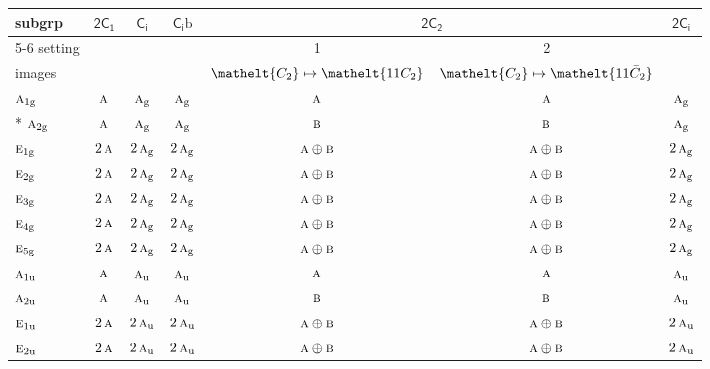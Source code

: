 \documentclass[10pt,a4paper]{article}
\numberwithin{equation}{section}
\newcommand{\eltfont}[1]{{\let\sigma\eltsigma\mathelt{#1}}}
\newcommand{\grp}[1]{\mathsf{#1}}
\newcommand{\irr}[1]{\text{\normalfont\scshape #1}}
\newcommand{\cls}[1]{\eltfont{#1}}
\newcommand{\ptag}[1]{\mathrm{#1}}
\newcommand{\barred}[1]{\bar{#1}}
\newcommand{\secondclass}{\mathrm{b}}
\begin{document}
{\small\begin{longtable}{@{}lcccccc@{}}\toprule
subgrp & \href{2C1.pdf}{$\grp{2C_{1}}$} & \href{S2.pdf}{$\grp{C_{i}}$} & \href{S2b.pdf}{$\grp{C_{i}}\secondclass$} & \multicolumn{2}{c}{\href{2C2.pdf}{$\grp{2C_{2}}$}} & \href{2S2.pdf}{$\grp{2C_{i}}$}\\\cmidrule(lr){5-6}
setting &  &  &  & 1 & 2 & \\
images &  &  &  & {\scriptsize $\cls{C_{2}} \mapsto \cls{11C_{2}}$} & {\scriptsize $\cls{C_{2}} \mapsto \cls{11\barred{C}_{2}}$} & \\\midrule\endhead
\bottomrule\endfoot\endlastfoot
$\irr{a}_{1\ptag{g}}$ & $\irr{a}$ & $\irr{a}_{\ptag{g}}$ & $\irr{a}_{\ptag{g}}$ & $\irr{a}$ & $\irr{a}$ & $\irr{a}_{\ptag{g}}$\\*
$\irr{a}_{2\ptag{g}}$ & $\irr{a}$ & $\irr{a}_{\ptag{g}}$ & $\irr{a}_{\ptag{g}}$ & $\irr{b}$ & $\irr{b}$ & $\irr{a}_{\ptag{g}}$\\
$\irr{e}_{1\ptag{g}}$ & $2\,\irr{a}$ & $2\,\irr{a}_{\ptag{g}}$ & $2\,\irr{a}_{\ptag{g}}$ & $\irr{a}\oplus \irr{b}$ & $\irr{a}\oplus \irr{b}$ & $2\,\irr{a}_{\ptag{g}}$\\
$\irr{e}_{2\ptag{g}}$ & $2\,\irr{a}$ & $2\,\irr{a}_{\ptag{g}}$ & $2\,\irr{a}_{\ptag{g}}$ & $\irr{a}\oplus \irr{b}$ & $\irr{a}\oplus \irr{b}$ & $2\,\irr{a}_{\ptag{g}}$\\
$\irr{e}_{3\ptag{g}}$ & $2\,\irr{a}$ & $2\,\irr{a}_{\ptag{g}}$ & $2\,\irr{a}_{\ptag{g}}$ & $\irr{a}\oplus \irr{b}$ & $\irr{a}\oplus \irr{b}$ & $2\,\irr{a}_{\ptag{g}}$\\
$\irr{e}_{4\ptag{g}}$ & $2\,\irr{a}$ & $2\,\irr{a}_{\ptag{g}}$ & $2\,\irr{a}_{\ptag{g}}$ & $\irr{a}\oplus \irr{b}$ & $\irr{a}\oplus \irr{b}$ & $2\,\irr{a}_{\ptag{g}}$\\
$\irr{e}_{5\ptag{g}}$ & $2\,\irr{a}$ & $2\,\irr{a}_{\ptag{g}}$ & $2\,\irr{a}_{\ptag{g}}$ & $\irr{a}\oplus \irr{b}$ & $\irr{a}\oplus \irr{b}$ & $2\,\irr{a}_{\ptag{g}}$\\
$\irr{a}_{1\ptag{u}}$ & $\irr{a}$ & $\irr{a}_{\ptag{u}}$ & $\irr{a}_{\ptag{u}}$ & $\irr{a}$ & $\irr{a}$ & $\irr{a}_{\ptag{u}}$\\
$\irr{a}_{2\ptag{u}}$ & $\irr{a}$ & $\irr{a}_{\ptag{u}}$ & $\irr{a}_{\ptag{u}}$ & $\irr{b}$ & $\irr{b}$ & $\irr{a}_{\ptag{u}}$\\
$\irr{e}_{1\ptag{u}}$ & $2\,\irr{a}$ & $2\,\irr{a}_{\ptag{u}}$ & $2\,\irr{a}_{\ptag{u}}$ & $\irr{a}\oplus \irr{b}$ & $\irr{a}\oplus \irr{b}$ & $2\,\irr{a}_{\ptag{u}}$\\
$\irr{e}_{2\ptag{u}}$ & $2\,\irr{a}$ & $2\,\irr{a}_{\ptag{u}}$ & $2\,\irr{a}_{\ptag{u}}$ & $\irr{a}\oplus \irr{b}$ & $\irr{a}\oplus \irr{b}$ & $2\,\irr{a}_{\ptag{u}}$\\

\end{longtable}}
\end{document}
